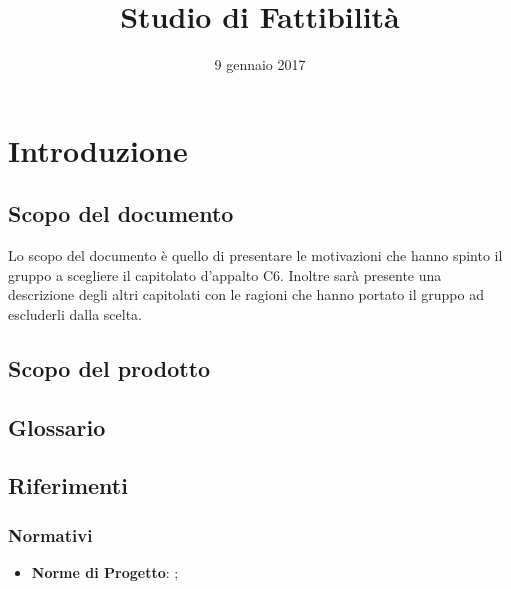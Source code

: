 


\author{\AZ}
\supervisor{\LS}
\dest{\ALL}
\title{Studio di Fattibilità}
\date{9 gennaio 2017}


\maketitle

\tableofcontents
\newpage

\section{Introduzione}
	\subsection{Scopo del documento}
	Lo scopo del documento è quello di presentare le motivazioni che hanno spinto il gruppo \hx{} a scegliere il capitolato d'appalto C6. 
	Inoltre sarà presente una descrizione degli altri capitolati con le ragioni che hanno portato il gruppo ad escluderli dalla scelta.
	
	\subsection{Scopo del prodotto}
	\scopo{}
	
	\subsection{Glossario}
	\presgloss{}
	
	\subsection{Riferimenti}
		\subsubsection{Normativi}
		\begin{itemize}
			\item \textbf{Norme di Progetto}: \NdP;
		\end{itemize}
